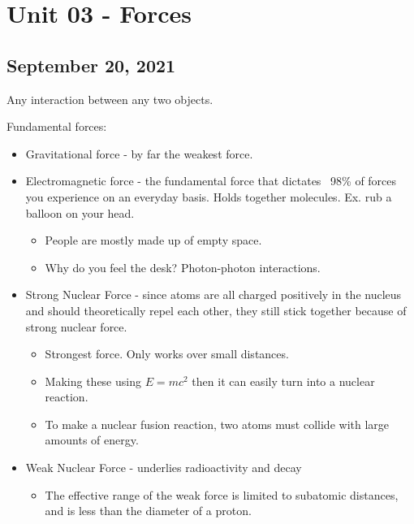 \documentclass{scrreprt} %
\begin{document}
\section{Unit 03 - Forces}

\subsection{September 20, 2021}

\begin{definition}[Force]
	Any interaction between any two objects.
\end{definition}

\begin{definition}
	Fundamental forces:

	\begin{itemize}
		\item Gravitational force - by far the weakest force.
		\item Electromagnetic force - the fundamental force that dictates ~98\%
		of forces you experience on an everyday basis. Holds together molecules.
		Ex. rub a balloon on your head.
		\begin{itemize}
			\item People are mostly made up of empty space.
			\item Why do you feel the desk? Photon-photon interactions.
		\end{itemize}
		\item Strong Nuclear Force - since atoms are all charged positively
		in the nucleus and should theoretically repel each other, they still stick
		together because of strong nuclear force.
		\begin{itemize}
			\item Strongest force. Only works over small distances.
			\item Making these using $E=mc^2$ then it can
			easily turn into a nuclear reaction.
			\item To make a nuclear fusion reaction, two atoms must collide with large amounts
			of energy. 
		\end{itemize}
		\item Weak Nuclear Force - underlies radioactivity and decay
		\begin{itemize}
			\item The effective range of the weak force is limited to subatomic
			distances, and is less than the diameter of a proton.
		\end{itemize}
	\end{itemize}
\end{definition}
\end{document}
